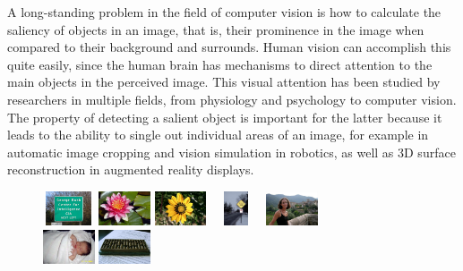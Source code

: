 \documentclass[10pt,twocolumn,letterpaper]{article}
\begin{document}
A long-standing problem in the field of computer vision is how to calculate the saliency of objects in an image, that is, their prominence in the image when compared to their background and surrounds.  Human vision can accomplish this quite easily, since the human brain has mechanisms to direct attention to the main objects in the perceived image.  This visual attention has been studied by researchers in multiple fields, from physiology and psychology to computer vision.  The property of detecting a salient object is important for the latter because it leads to the ability to single out individual areas of an image, for example in automatic image cropping and vision simulation in robotics, as well as 3D surface reconstruction in augmented reality displays.

\begin{figure}[h]
\begin{center}
    \includegraphics[width=0.6in,height=0.4in]{./Figures/example_image/4_140_140907.jpg}
    \includegraphics[width=0.6in,height=0.4in]{./Figures/example_image/4_141_141474.jpg}
    \includegraphics[width=0.6in,height=0.4in]{./Figures/example_image/4_141_141906.jpg}
    \includegraphics[width=0.6in,height=0.4in]{./Figures/example_image/4_142_142237.jpg}
    \includegraphics[width=0.6in,height=0.4in]{./Figures/example_image/4_142_142635.jpg}\\
    \includegraphics[width=0.6in,height=0.4in]{./Figures/example_image/4_124_124377.jpg}
    \includegraphics[width=0.6in,height=0.4in]{./Figures/example_image/4_124_124385.jpg}

\end{center}
\end{figure}
\end{document}
